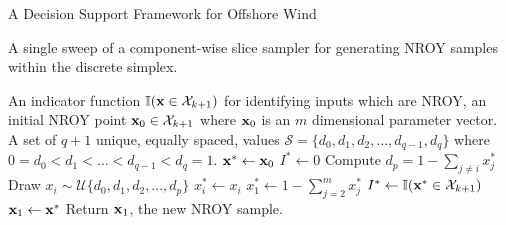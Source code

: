 \begin{chapter}{A Decision Support Framework for Offshore Wind \label{Ch:ds-for-ow}}
\begin{algorithm}[h]
\caption{A single sweep of a component-wise slice sampler for generating NROY samples within the discrete simplex. \label{Alg:disc-slice}}
\begin{algorithmic}
\Require An indicator function $\mathbb{I}(\mathbf{x} \in \mathcal{X}_{k+1})$ for identifying inputs which are NROY, an initial NROY point $\mathbf{x}_0 \in \mathcal{X}_{k+1}$ where $\mathbf{x}_0$ is an $m$ dimensional parameter vector. A set of $q+1$ unique, equally spaced, values $\mathcal{S} = \{ d_0, d_1, d_2, \ldots, d_{q-1}, d_q \}$ where $0 = d_0 < d_1 < \ldots < d_{q-1} < d_q = 1$.
\State $\mathbf{x}^{*} \gets \mathbf{x}_0$
 \State $I^{*} \gets 0$ 
  \State Compute $d_p = 1 - \sum_{j \neq i} x^{*}_j$
  \State Draw $x_i \sim \mathcal{U} \{ d_0, d_1, d_2, \ldots, d_p \}$ 
  \State $x^{*}_i \gets x_i$
  \State $x^{*}_1 \gets 1 - \sum_{j = 2}^m x_j^{*}$ 
  \State $I^{*} \gets \mathbb{I}(\mathbf{x}^{*} \in \mathcal{X}_{k+1})$ 
 \EndWhile
\EndFor
\State $\mathbf{x}_1 \gets \mathbf{x}^{*}$
\State Return $\mathbf{x}_1$, the new NROY sample.
\end{algorithmic}
\end{algorithm}


\end{chapter}
